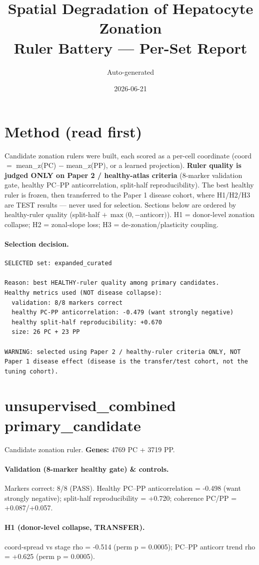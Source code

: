 \documentclass[10pt]{article}
\title{Spatial Degradation of Hepatocyte Zonation\\ Ruler Battery --- Per-Set Report}
\author{Auto-generated}\date{2026-06-21}
\begin{document}
\maketitle
\section*{Method (read first)}
Candidate zonation rulers were built, each scored as a per-cell coordinate
(coord $=$ mean\_z(PC) $-$ mean\_z(PP), or a learned projection). \textbf{Ruler quality is judged
ONLY on Paper 2 / healthy-atlas criteria} (8-marker validation gate, healthy PC--PP
anticorrelation, split-half reproducibility). The best healthy ruler is frozen, then transferred
to the Paper 1 disease cohort, where H1/H2/H3 are TEST results --- never used for selection.
Sections below are ordered by healthy-ruler quality (split-half $+\,\max(0,-$anticorr$)$).
H1 = donor-level zonation collapse; H2 = zonal-slope loss; H3 = de-zonation/plasticity coupling.

\paragraph{Selection decision.}\begin{verbatim}
SELECTED set: expanded_curated

Reason: best HEALTHY-ruler quality among primary candidates.
Healthy metrics used (NOT disease collapse):
  validation: 8/8 markers correct
  healthy PC-PP anticorrelation: -0.479 (want strongly negative)
  healthy split-half reproducibility: +0.670
  size: 26 PC + 23 PP

WARNING: selected using Paper 2 / healthy-ruler criteria ONLY, NOT Paper 1 disease effect (disease is the transfer/test cohort, not the tuning cohort).
\end{verbatim}
\clearpage
\section*{unsupervised\_combined \hfill primary\_candidate}
Candidate zonation ruler. \textbf{Genes:} 4769 PC + 3719 PP.
\paragraph{Validation (8-marker healthy gate) \& controls.} Markers correct: 8/8 (PASS). Healthy PC--PP anticorrelation = -0.498 (want strongly negative); split-half reproducibility = +0.720; coherence PC/PP = +0.087/+0.057.
\paragraph{H1 (donor-level collapse, TRANSFER).} coord-spread vs stage rho = -0.514 (perm p = 0.0005); PC--PP anticorr trend rho = +0.625 (perm p = 0.0005).
\end{document}
